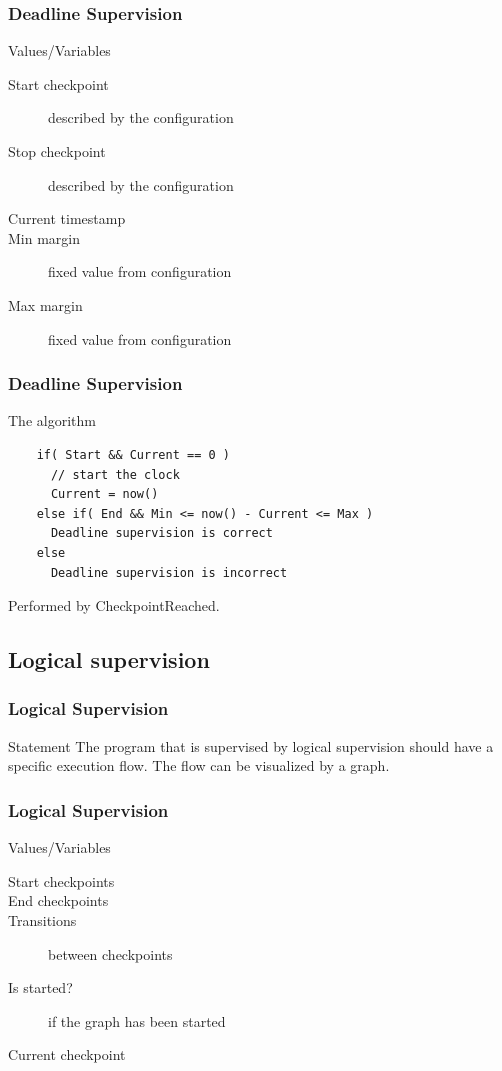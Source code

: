 \documentclass{beamer}
\begin{document}
\begin{frame}
  \frametitle{Deadline Supervision}
  \begin{block}{Values/Variables}
    \begin{description}
      \item[Start checkpoint] described by the configuration
      \item[Stop checkpoint] described by the configuration
      \item[Current timestamp]
      \item[Min margin] fixed value from configuration
      \item[Max margin] fixed value from configuration
    \end{description}
  \end{block}
\end{frame}

\begin{frame}[fragile]
  \frametitle{Deadline Supervision}
  \begin{block}{The algorithm}
    \begin{lstlisting}
    if( Start && Current == 0 )
      // start the clock
      Current = now()
    else if( End && Min <= now() - Current <= Max )
      Deadline supervision is correct
    else
      Deadline supervision is incorrect
    \end{lstlisting}
  \end{block}
  Performed by CheckpointReached.
\end{frame}

\subsection{Logical supervision}
\begin{frame}
  \frametitle{Logical Supervision}
  \begin{block}{Statement}
    The program that is supervised by logical supervision should have
    a specific execution flow. The flow can be visualized by a
    graph.
  \end{block}
\end{frame}

\begin{frame}
  \frametitle{Logical Supervision}
  \begin{block}{Values/Variables}
    \begin{description}
      \item[Start checkpoints]
      \item[End checkpoints]
      \item[Transitions] between checkpoints
      \item[Is started?] if the graph has been started
      \item[Current checkpoint]
    \end{description}
  \end{block}
\end{frame}
\end{document}
